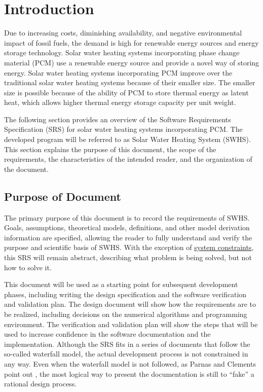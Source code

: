 \documentclass[12pt]{article}
\begin{document}
\section{Introduction}
\label{Sec:Intro}
Due to increasing costs, diminishing availability, and negative environmental impact of fossil fuels, the demand is high for renewable energy sources and energy storage technology. Solar water heating systems incorporating phase change material (PCM) use a renewable energy source and provide a novel way of storing energy. Solar water heating systems incorporating PCM improve over the traditional solar water heating systems because of their smaller size. The smaller size is possible because of the ability of PCM to store thermal energy as latent heat, which allows higher thermal energy storage capacity per unit weight.

The following section provides an overview of the Software Requirements Specification (SRS) for solar water heating systems incorporating PCM. The developed program will be referred to as Solar Water Heating System (SWHS). This section explains the purpose of this document, the scope of the requirements, the characteristics of the intended reader, and the organization of the document.

\subsection{Purpose of Document}
\label{Sec:DocPurpose}
The primary purpose of this document is to record the requirements of SWHS. Goals, assumptions, theoretical models, definitions, and other model derivation information are specified, allowing the reader to fully understand and verify the purpose and scientific basis of SWHS. With the exception of \hyperref[Sec:SysConstraints]{system constraints}, this SRS will remain abstract, describing what problem is being solved, but not how to solve it.

This document will be used as a starting point for subsequent development phases, including writing the design specification and the software verification and validation plan. The design document will show how the requirements are to be realized, including decisions on the numerical algorithms and programming environment. The verification and validation plan will show the steps that will be used to increase confidence in the software documentation and the implementation. Although the SRS fits in a series of documents that follow the so-called waterfall model, the actual development process is not constrained in any way. Even when the waterfall model is not followed, as Parnas and Clements point out \cite{parnasClements1986}, the most logical way to present the documentation is still to ``fake'' a rational design process.
\end{document}
